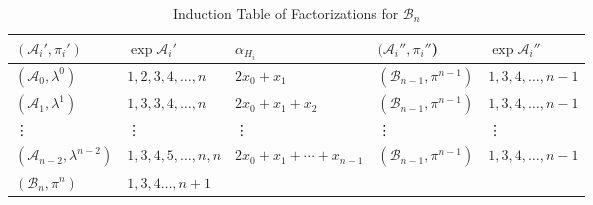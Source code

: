 \documentclass[12pt]{amsart}
\newcommand\CA{{\mathscr A}}
\newcommand\CB{{\mathscr B}}
\numberwithin{equation}{section}
\theoremstyle{plain}
\theoremstyle{definition}
\begin{document}
	\begin{table}[ht!b]
		\renewcommand{\arraystretch}{1.5}
		\begin{tabular}{lllll}\hline
			$(\CA_i',\pi_i')$ &  $\exp\CA_i'$ & $\alpha_{H_i}$ & $(\CA_i'', \pi_i''$) & $\exp\CA_i''$\\
			\hline\hline
			$(\CA_0,\lambda^{0})$ &  $1,2,3,4, \ldots,n $ &  $2x_0+x_1$ & $(\CB_{n-1},\pi^{n-1})$ & $1,3,4,\ldots,n-1$ \\
			$(\CA_1,\lambda^{1})$ &  $1,3,3,4, \ldots,n $ &  $2x_0+x_1+x_2$ & $(\CB_{n-1},\pi^{n-1})$ & $1,3,4,\ldots,n-1$ \\
			\vdots & \vdots  & \vdots & \vdots  & \vdots  \\
			$(\CA_{n-2},\lambda^{n-2})$ &  $1,3,4,5, \ldots,n,n $ &  $2x_0+x_1+\cdots+x_{n-1}$ & $(\CB_{n-1},\pi^{n-1})$ & $1,3,4,\ldots,n-1$ \\
			$(\CB_n,\pi^{n})$ &  $1,3,4 \ldots,n+1$ & & &  \\

			\hline
		\end{tabular}
		\smallskip
		\caption{Induction Table of Factorizations for $\CB_n$}
		\label{table0}
	\end{table}
\end{document}
